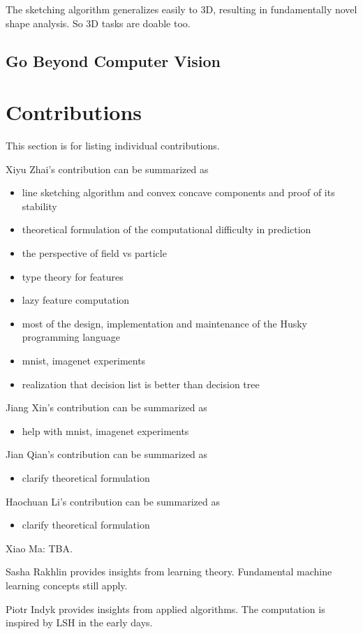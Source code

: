 \documentclass[11pt, oneside]{article}   	%
\theoremstyle{definition}
\begin{document}
The sketching algorithm generalizes easily to 3D, resulting in fundamentally novel shape analysis. So 3D tasks are doable too.

\subsection{Go Beyond Computer Vision}


\section{Contributions}

This section is for listing individual contributions.

Xiyu Zhai's contribution can be summarized as
\begin{itemize}
	\item line sketching algorithm and convex concave components and proof of its stability
	\item theoretical formulation of the computational difficulty in prediction
	\item the perspective of field vs particle
	\item type theory for features
	\item lazy feature computation
	\item most of the design, implementation and maintenance of the Husky programming language
	\item mnist, imagenet experiments
	\item realization that decision list is better than decision tree
\end{itemize}

Jiang Xin's contribution can be summarized as
\begin{itemize}
	\item help with mnist, imagenet experiments
\end{itemize}

Jian Qian's contribution can be summarized as
\begin{itemize}
	\item clarify theoretical formulation
\end{itemize}

Haochuan Li's contribution can be summarized as
\begin{itemize}
	\item clarify theoretical formulation
\end{itemize}

Xiao Ma: TBA.

Sasha Rakhlin provides insights from learning theory. Fundamental machine learning concepts still apply.

Piotr Indyk provides insights from applied algorithms. The computation is inspired by LSH in the early days.

\appendix
\end{document}
